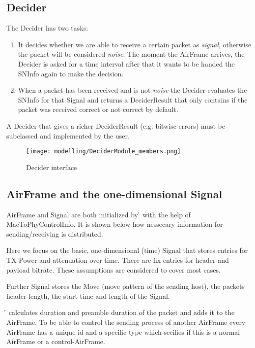 \subsection{Decider}
\label{decider}

The Decider has two tasks:
\begin{enumerate}
	\item It decides whether we are able to receive a certain packet as \textit{signal}, otherwise the packet will be considered \textit{noise}. The moment the AirFrame arrives, the Decider is asked for a time interval after that it wants to be handed the SNInfo again to make the decision.
	\item When a packet has been received and is not \textit{noise} the Decider evaluates the SNInfo for that Signal and returns a DeciderResult that only contains if the packet was received correct or not correct by default.
\end{enumerate}

A Decider that gives a richer DeciderResult (e.g. bitwise errors) must be subclassed and implemented by the user.

\begin{figure}[H]
 \centering
 \texttt{[image: modelling/DeciderModule\_members.png]}
 \caption{Decider interface}
 \label{fig: Decider interface}
\end{figure}


\subsection{AirFrame and the one-dimensional Signal}
\label{AirFrame and Signal}

AirFrame and Signal are both initialized by \h{\bp} with the help of MacToPhyControlInfo.
It is shown below how nessecary information for sending/receiving is distributed.

Here we focus on the basic, one-dimensional (time) Signal that stores entries for TX Power and attenuation over time. There are fix entries for header and payload bitrate. These assumptions are considered to cover most cases. 

Further Signal stores the Move (move pattern of the sending host), the packets header length, the start time and length of the Signal.

\h{\bp} calculates duration and preamble duration of the packet and adds it to the AirFrame. 
To be able to control the sending process of another AirFrame every AirFrame has a unique id and a specific type which secifies if this is a normal AirFrame or a control-AirFrame.


